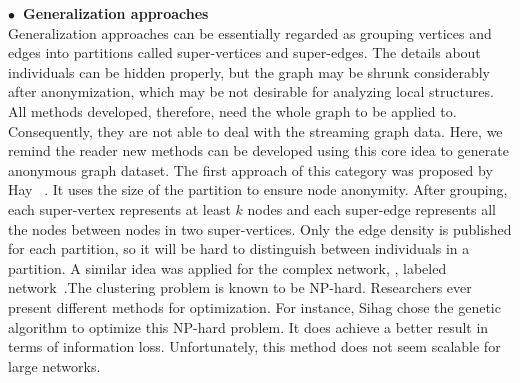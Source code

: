 \hspace{-2em}\textbf{$\bullet$~Generalization approaches}\\
Generalization approaches can be essentially regarded as grouping vertices and edges into partitions called super-vertices and super-edges. The details about individuals can be hidden properly, but the graph may be shrunk considerably after anonymization, which may be not desirable for analyzing local structures. All methods developed, therefore, need the whole graph to be applied to. Consequently, they are not able to deal with the streaming graph data. Here, we remind the reader new methods can be developed using this core idea to generate anonymous graph dataset. The first approach of this category was proposed by Hay {\etal}~\cite{Hay_Anonymizing_2007}. It uses the size of the partition to ensure node anonymity. After grouping, each super-vertex represents at least $k$ nodes and each super-edge represents all the nodes between nodes in two super-vertices. Only the edge density is published for each partition, so it will be hard to distinguish between individuals in a partition. A similar idea was applied for the complex network, {\ie}, labeled network~\cite{Bhagat_Class_2009}.The clustering problem is known to be NP-hard. Researchers ever present different methods for optimization. For instance, Sihag {\etal} chose the genetic algorithm to optimize this NP-hard problem. It does achieve a better result in terms of information loss. Unfortunately, this method does not seem scalable for large networks. 


